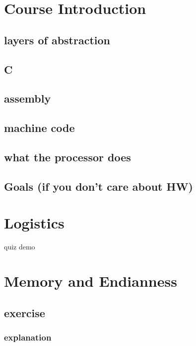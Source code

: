 \section{Course Introduction}

\subsection{layers of abstraction}

\subsection{C}





\subsection{assembly}




\subsection{machine code}



\subsection{what the processor does}




\subsection{Goals (if you don't care about HW)}


\section{Logistics}


\begin{frame}{quiz demo}
\end{frame}

\section{Memory and Endianness}



\subsection{exercise}

\subsubsection{explanation}

